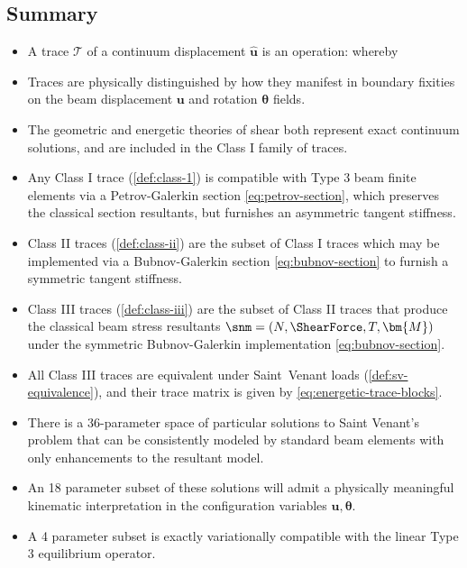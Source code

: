 

\subsection{Summary}

\begin{itemize}
    \item A trace \(\mathcal{T}\) of a continuum displacement \(\hat{\bm u}\) is an operation:
    whereby
    \item Traces are physically distinguished by how they manifest in boundary fixities on the beam displacement \(\bm{u}\) and rotation \(\bm{\theta}\) fields.
    \item The geometric \citep{cowper1966shear} and energetic \citep{renton1991generalized} theories of shear  
     both represent exact continuum solutions, and are included in the Class I family of traces. 
    \item Any Class I trace (\cref{def:class-1}) is compatible with Type 3 beam finite elements via a Petrov-Galerkin section \eqref{eq:petrov-section}, which preserves the classical section resultants, but furnishes an asymmetric tangent stiffness.
    \item Class II traces (\cref{def:class-ii}) are the subset of Class I traces which may be implemented via a Bubnov-Galerkin section \eqref{eq:bubnov-section} to furnish a symmetric tangent stiffness.
    \item Class III traces (\cref{def:class-iii}) are the subset of Class II traces that produce the classical beam stress resultants \(\snm = (N,\ShearForce,T,\bm{M})\) under the symmetric Bubnov-Galerkin implementation \eqref{eq:bubnov-section}.
    \item All Class III traces are equivalent under Saint~Venant loads (\cref{def:sv-equivalence}), and their trace matrix is given by \eqref{eq:energetic-trace-blocks}.
\end{itemize}

\begin{itemize}
    \item There is a 36-parameter space of particular solutions to Saint Venant's problem that can be consistently modeled by standard beam elements with only enhancements to the resultant model.
    \item An 18 parameter subset of these solutions will admit a physically meaningful kinematic interpretation in the configuration variables \(\bm{u},\bm{\theta}\).
    \item A  4 parameter subset is exactly variationally compatible with the linear Type 3 equilibrium operator.
\end{itemize}

